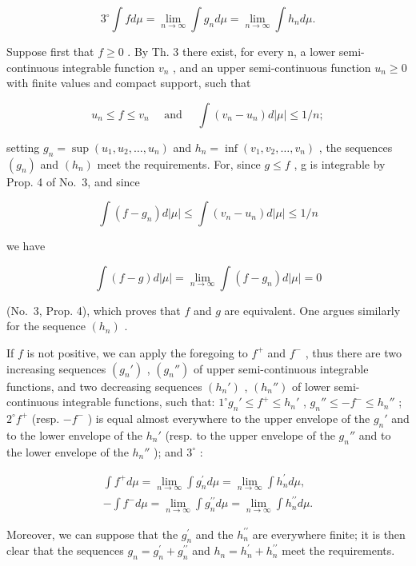 \[
3 ^ {\circ} \int f d \mu = \lim _ {n \rightarrow \infty} \int g _ {n} d \mu = \lim _ {n \rightarrow \infty} \int h _ {n} d \mu .
\]

Suppose first that \(f \geqslant 0\) . By Th. 3 there exist, for every n, a lower semi-continuous integrable function \(v_{n}\) , and an upper semi-continuous function \(u_{n} \geqslant 0\) with finite values and compact support, such that

\[
u _ {n} \leqslant f \leqslant v _ {n} \quad \text { and } \quad \int (v _ {n} - u _ {n}) d | \mu | \leqslant 1 / n;
\]

setting \(g_{n} = \sup(u_{1}, u_{2}, \ldots, u_{n})\) and \(h_{n} = \inf(v_{1}, v_{2}, \ldots, v_{n})\) , the sequences \((g_{n})\) and \((h_{n})\) meet the requirements. For, since \(g \leqslant f\) , g is integrable by Prop. 4 of No.~3, and since

\[
\int (f - g _ {n}) d | \mu | \leqslant \int (v _ {n} - u _ {n}) d | \mu | \leqslant 1 / n
\]

we have

\[
\int (f - g) d | \mu | = \lim _ {n \rightarrow \infty} \int (f - g _ {n}) d | \mu | = 0
\]

(No.~3, Prop. 4), which proves that \(f\) and \(g\) are equivalent. One argues similarly for the sequence \((h_n)\) .

If \(f\) is not positive, we can apply the foregoing to \(f^{+}\) and \(f^{-}\) , thus there are two increasing sequences \((g_n')\) , \((g_n'')\) of upper semi-continuous integrable functions, and two decreasing sequences \((h_n')\) , \((h_n'')\) of lower semi-continuous integrable functions, such that: \(1^\circ g_n' \leqslant f^{+} \leqslant h_n'\) , \(g_n'' \leqslant -f^{-} \leqslant h_n''\) ; \(2^\circ f^{+}\) (resp. \(-f^{-}\) ) is equal almost everywhere to the upper envelope of the \(g_n'\) and to the lower envelope of the \(h_n'\) (resp. to the upper envelope of the \(g_n''\) and to the lower envelope of the \(h_n''\) ); and \(3^\circ\) :

\[
\begin{array}{r} \int f ^ {+} d \mu = \lim _ {n \to \infty} \int g _ {n} ^ {\prime} d \mu = \lim _ {n \to \infty} \int h _ {n} ^ {\prime} d \mu , \\ - \int f ^ {-} d \mu = \lim _ {n \to \infty} \int g _ {n} ^ {\prime \prime} d \mu = \lim _ {n \to \infty} \int h _ {n} ^ {\prime \prime} d \mu . \end{array}
\]

Moreover, we can suppose that the \(g_{n}^{\prime}\) and the \(h_{n}^{\prime\prime}\) are everywhere finite; it is then clear that the sequences \(g_{n}=g_{n}^{\prime}+g_{n}^{\prime\prime}\) and \(h_{n}=h_{n}^{\prime}+h_{n}^{\prime\prime}\) meet the requirements.


